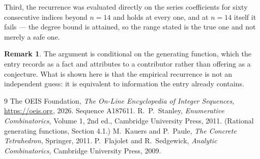 \documentclass[11pt,a4paper]{article}
\theoremstyle{plain}
\theoremstyle{definition}
\newtheorem{remark}[theorem]{Remark}
\begin{document}
Third, the recurrence was evaluated directly on the series coefficients for sixty consecutive
indices beyond $n=14$ and holds at every one, and at $n=14$ itself it fails --- the
degree bound is attained, so the range stated is the true one and not merely a safe one.

\begin{remark}
The argument is conditional on the generating function, which the entry records as a fact and
attributes to a contributor rather than offering as a conjecture. What is shown here is that
the empirical recurrence is not an independent guess: it is equivalent to information the
entry already contains.
\end{remark}

\begin{thebibliography}{9}
 The OEIS Foundation, \emph{The On-Line Encyclopedia of Integer
Sequences}, \url{https://oeis.org}, 2026. Sequence A187611.
 R.~P.~Stanley, \emph{Enumerative Combinatorics}, Volume 1, 2nd ed.,
Cambridge University Press, 2011. (Rational generating functions, Section 4.1.)
 M.~Kauers and P.~Paule, \emph{The Concrete Tetrahedron}, Springer, 2011.
 P.~Flajolet and R.~Sedgewick, \emph{Analytic Combinatorics}, Cambridge
University Press, 2009.
\end{thebibliography}
\end{document}

